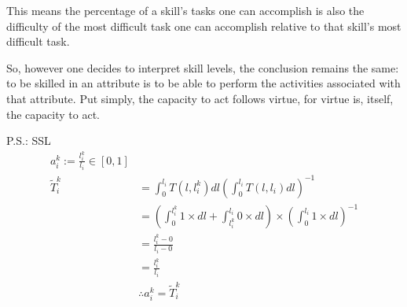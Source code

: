 \documentclass[hidelinks, nonatbib]{elsarticle}
\begin{document}
\begin{definition}[Skill]
    This means the percentage of a skill's tasks one can accomplish is also
    the difficulty of the most difficult task one can accomplish relative to that
    skill's most difficult task.

    So, however one decides to interpret skill levels, the conclusion remains the
    same: to be skilled in an attribute is to be able to perform the activities
    associated with that attribute. Put simply, the capacity to act follows virtue,
    for virtue is, itself, the capacity to act.
\end{definition}
P.S.: SSL
\begin{align}
    a_{i}^{k} := \frac{l_{i}^{k}}{l_{i}} \in [0,1]
    \\
    \tilde{T}_{i}^{k} 
    &= 
    \int_{0}^{l_i}{
        T(l,l_{i}^{k})
        dl
    }
    \left(
        \int_{0}^{l_i}{
            T(l,l_{i})
            dl
        }
    \right) ^ {-1}
    \\
    &= 
    \left(
        \int_{0}^{l_{i}^{k}}{
            1
            \times
            dl
        }
        +
        \int_{l_{i}^{k}}^{l_i}{
            0
            \times
            dl
        }
    \right)
    \times
    \left(
        \int_{0}^{l_i}{
            1
            \times
            dl
        }
    \right) ^ {-1}
    \\
    &= 
    \frac{l_{i}^{k} - 0}{l_{i} - 0}
    \\
    &= 
    \frac{l_{i}^{k}}{l_{i}}
    \\
    &\therefore
    a_{i}^{k} = \tilde{T}_{i}^{k}
\end{align}
\end{document}
